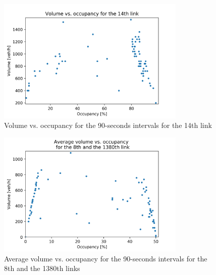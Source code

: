 \documentclass[a4paper, 12pt,oneside]{article}
\begin{document}
\begin{figure}[H]
    \begin{center}
        \includegraphics[width=9cm]{Images/Volume vs. occupancy for the 90-seconds intervals for the 14th link.png}
        \caption{Volume vs. occupancy for the 90-seconds intervals for the 14th link}
        \label{Volume vs. occupancy for the 90-seconds intervals for the 14th link}
    \end{center}
\end{figure}

\begin{figure}[H]
    \begin{center}
        \includegraphics[width=9cm]{Images/Volume vs. occupancy for the 90-seconds intervals for the 8th and the 1380th link.png}
        \caption{Average volume vs. occupancy for the 90-seconds intervals for the 8th and the 1380th links}
        \label{Average volume vs. occupancy for the 90-seconds intervals for the 8th and the 1380th links}
    \end{center}
\end{figure}
\end{document}
